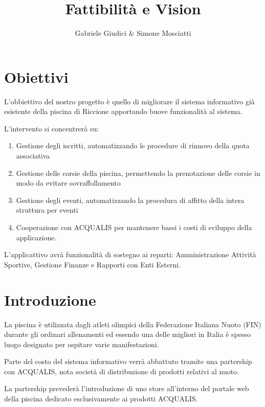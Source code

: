 \documentclass[11pt]{article} %
\title{Fattibilità e Vision}
\author{Gabriele Giudici \& Simone Mosciatti}
\begin{document}
\color{textblack}
\pagecolor{backgroundwhite}

\maketitle

\tableofcontents



\section{Obiettivi}

L'obbiettivo del nostro progetto è quello di migliorare il sistema informativo già esistente della piscina di Riccione apportando buove funzionalità al sistema.

L'intervento si concentrerà su:

\begin{enumerate}
	\item Gestione degli iscritti, automatizzando le procedure di rinnovo della quota associativa
	\item Gestione delle corsie della piscina, permettendo la prenotazione delle corsie in modo da evitare sovraffollamento
	\item Gestione degli eventi, automatizzando la procedura di affitto della intera struttura per eventi
	\item Cooperazione con ACQUALIS per mantenere bassi i costi di sviluppo della applicazione.
\end{enumerate}

L'applicattivo avrà funzionalità di sostegno ai reparti: Amministrazione Attività Sportive,  Gestione Finanze e Rapporti con Enti Esterni.



\section{Introduzione}


La piscina è utilizzata dagli atleti olimpici della Federazione Italiana Nuoto (FIN) durante gli ordinari allenamenti ed essendo una delle migliori in Italia è spesso luogo designato per ospitare varie manifestazioni.

Parte del costo del sistema informativo verrà abbattuto tramite una partership con ACQUALIS, nota società di distribuzione di prodotti relativi al nuoto.

La partership prevederà l'introduzione di uno store all'interno del portale web della piscina dedicato esclusivamente ai prodotti ACQUALIS.
\end{document}
